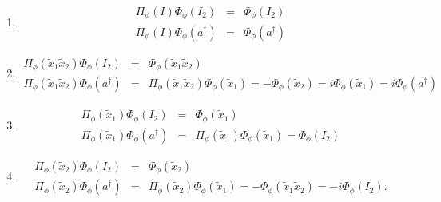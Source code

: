 \documentclass[aps,preprint]{revtex4}
\begin{document}
\begin{enumerate}
\item 
\begin{eqnarray}
\Pi _{\phi }\left( I\right) \Phi _{\phi }\left( I_{2}\right) &=&\Phi _{\phi
}\left( I_{2}\right) \\
\Pi _{\phi }\left( I\right) \Phi _{\phi }\left( a^{\dagger }\right) &=&\Phi
_{\phi }\left( a^{\dagger }\right)
\end{eqnarray}

\item 
\begin{eqnarray}
\Pi _{\phi }\left( \widetilde{x}_{1}\widetilde{x}_{2}\right) \Phi _{\phi
}\left( I_{2}\right) &=&\Phi _{\phi }\left( \widetilde{x}_{1}\widetilde{x}%
_{2}\right) \\
\Pi _{\phi }\left( \widetilde{x}_{1}\widetilde{x}_{2}\right) \Phi _{\phi
}\left( a^{\dagger }\right) &=&\Pi _{\phi }\left( \widetilde{x}_{1}%
\widetilde{x}_{2}\right) \Phi _{\phi }\left( \widetilde{x}_{1}\right) =-\Phi
_{\phi }\left( \widetilde{x}_{2}\right) =i\Phi _{\phi }\left( \widetilde{x}%
_{1}\right) =i\Phi _{\phi }\left( a^{\dagger }\right)
\end{eqnarray}

\item 
\begin{eqnarray}
\Pi _{\phi }\left( \widetilde{x}_{1}\right) \Phi _{\phi }\left( I_{2}\right)
&=&\Phi _{\phi }\left( \widetilde{x}_{1}\right) \\
\Pi _{\phi }\left( \widetilde{x}_{1}\right) \Phi _{\phi }\left( a^{\dagger
}\right) &=&\Pi _{\phi }\left( \widetilde{x}_{1}\right) \Phi _{\phi }\left( 
\widetilde{x}_{1}\right) =\Phi _{\phi }\left( I_{2}\right)
\end{eqnarray}

\item 
\begin{eqnarray}
\Pi _{\phi }\left( \widetilde{x}_{2}\right) \Phi _{\phi }\left( I_{2}\right)
&=&\Phi _{\phi }\left( \widetilde{x}_{2}\right) \\
\Pi _{\phi }\left( \widetilde{x}_{2}\right) \Phi _{\phi }\left( a^{\dagger
}\right) &=&\Pi _{\phi }\left( \widetilde{x}_{2}\right) \Phi _{\phi }\left( 
\widetilde{x}_{1}\right) =-\Phi _{\phi }\left( \widetilde{x}_{1}\widetilde{x}%
_{2}\right) =-i\Phi _{\phi }\left( I_{2}\right) .
\end{eqnarray}
\end{enumerate}
\end{document}
